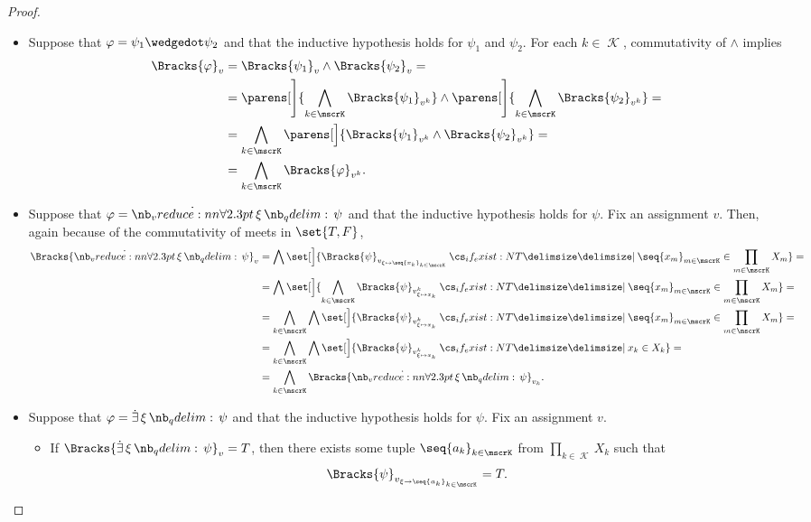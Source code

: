 \begin{proof}
\begin{itemize}
    \item Suppose that \( \varphi = \psi_1 \synwedge \psi_2 \) and that the inductive hypothesis holds for \( \psi_1 \) and \( \psi_2 \). For each \( k \in \mscrK \), commutativity of \( \wedge \) implies
    \begin{equation}\label{eq:thm:direct_product_preserves_positive_formulas/proof_conjunction}
      \begin{aligned}
        \Bracks{\varphi}_v
        &=
        \Bracks{\psi_1}_v \wedge \Bracks{\psi_2}_v
        = \\ &=
        \parens[\Bigg]{ \bigwedge_{k \in \mscrK} \Bracks{\psi_1}_{v^k} } \wedge \parens[\Bigg]{ \bigwedge_{k \in \mscrK} \Bracks{\psi_2}_{v^k} }
        = \\ &=
        \bigwedge_{k \in \mscrK} \parens[\Big]{ \Bracks{\psi_1}_{v^k} \wedge \Bracks{\psi_2}_{v^k} }
        = \\ &=
        \bigwedge_{k \in \mscrK} \Bracks{\varphi}_{v^k}.
      \end{aligned}
    \end{equation}

    \item Suppose that \( \varphi = \qforall \xi \psi \) and that the inductive hypothesis holds for \( \psi \). Fix an assignment \( v \). Then, again because of the commutativity of meets in \( \set{ T, F } \),
    \begin{align*}
      \Bracks{\qforall \xi \psi}_v
      &=
      \bigwedge \set[\Big]{ \Bracks{\psi}_{v_{\xi \mapsto \seq{ x_k }_{k \in \mscrK}}} \given* \seq{ x_m }_{m \in \mscrK} \in \prod_{m \in \mscrK} X_m }
      = \\ &=
      \bigwedge \set[\Big]{ \bigwedge_{k \in \mscrK} \Bracks{\psi}_{v^k_{\xi \mapsto x_k}} \given* \seq{ x_m }_{m \in \mscrK} \in \prod_{m \in \mscrK} X_m }
      = \\ &=
      \bigwedge_{k \in \mscrK} \bigwedge \set[\Big]{ \Bracks{\psi}_{v^k_{\xi \mapsto x_k}} \given* \seq{ x_m }_{m \in \mscrK} \in \prod_{m \in \mscrK} X_m }
      = \\ &=
      \bigwedge_{k \in \mscrK} \bigwedge \set[\Big]{ \Bracks{\psi}_{v^k_{\xi \mapsto x_k}} \given* x_k \in X_k }
      = \\ &=
      \bigwedge_{k \in \mscrK} \Bracks{\qforall \xi \psi}_{v_k}.
    \end{align*}

    \item Suppose that \( \varphi = \qexists \xi \psi \) and that the inductive hypothesis holds for \( \psi \). Fix an assignment \( v \).
    \begin{itemize}
      \item If \( \Bracks{\qexists \xi \psi}_v = T \), then there exists some tuple \( \seq{ a_k }_{k \in \mscrK} \) from \( \prod_{k \in \mscrK} X_k \) such that
      \begin{equation*}
        \Bracks{\psi}_{v_{\xi \to \seq{ a_k }_{k \in \mscrK}}} = T.
      \end{equation*}


\end{itemize}
\end{itemize}
\end{proof}
